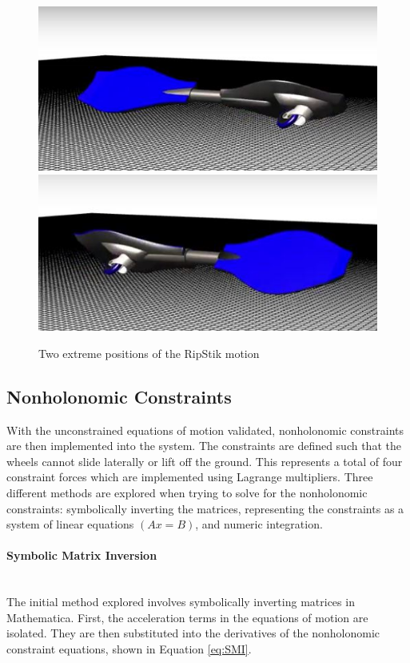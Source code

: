 \begin{figure}[!htb]
	\centering
	\includegraphics[width=\linewidth]{oneswing}
	\endminipage\hspace{1em}%
	\includegraphics[width=\linewidth]{twoswing}
	\endminipage
	\caption{Two extreme positions of the RipStik motion}
	\label{fig:RipStikModel1}
\end{figure}

\subsection{Nonholonomic Constraints}

With the unconstrained equations of motion validated, nonholonomic constraints are then implemented into the system. 
The constraints are defined such that the wheels cannot slide laterally or lift off the ground. 
This represents a total of four constraint forces which are implemented using Lagrange multipliers.
Three different methods are explored when trying to solve for the nonholonomic constraints: symbolically inverting the matrices, representing the constraints as a system of linear equations $(Ax=B)$, and numeric integration.

\paragraph{Symbolic Matrix Inversion}\mbox{}\\
The initial method explored involves symbolically inverting matrices in Mathematica. First, the acceleration terms in the equations of motion are isolated. 
They are then substituted into the derivatives of the nonholonomic constraint equations, shown in Equation \ref{eq:SMI}.

